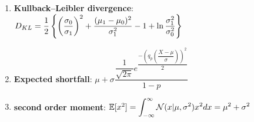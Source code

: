 \begin{enumerate}
    \item
    \textbf{Kullback–Leibler divergence}:
    ${\displaystyle D_{KL} = {1 \over 2}\left\{\left({\dfrac {\sigma _{0}}{\sigma _{1}}}\right)^{2}+{\dfrac {(\mu _{1}-\mu _{0})^{2}}{\sigma _{1}^{2}}}-1+\ln {\sigma _{1}^{2} \over \sigma _{0}^{2}}\right\}}$
    \hfill\cite{wiki/Normal_distribution}

    \item
    \textbf{Expected shortfall}:
    ${\displaystyle \mu +\sigma {\dfrac {{\dfrac {1}{\sqrt {2\pi }}}e^{\dfrac {-\left(q_{p}\left({\dfrac {X-\mu }{\sigma }}\right)\right)^{2}}{2}}}{1-p}}}$
    \hfill\cite{wiki/Normal_distribution}

    \item
    \textbf{second order moment}:
    $
        \mathbb{E}[x^2]
        = \displaystyle\int_{-\infty}^\infty \mathcal{N}(x|\mu, \sigma^2) x^2 dx
        = \mu^2 + \sigma^2
    $
    \hfill \cite{ml/book/Pattern-Recognition-And-Machine-Learning/Christopher-M-Bishop}

\end{enumerate}

